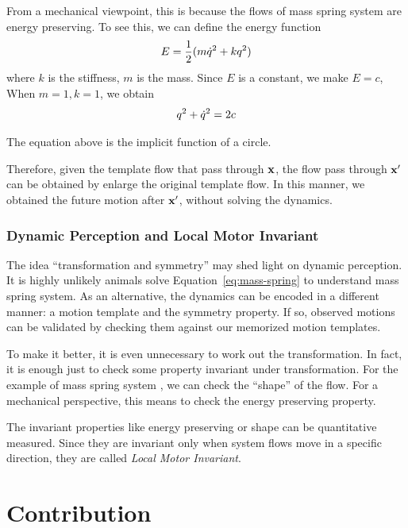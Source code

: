 From a mechanical viewpoint, this is because the flows of mass spring system are energy preserving.
To see this, we can define the energy function
\[
E=\frac{1}{2}(m\dot{q}^2+kq^2)
\]
where $k$ is the stiffness, $m$ is the mass.
Since $E$ is a constant, we make $E=c$,
When $m=1,k=1$, we obtain
\[
 q^2+\dot{q}^2=2c
\]
 
The equation above is the implicit function of a circle.

Therefore, given the template flow that pass through  $\mathbf{x}$, the flow pass through $\mathbf{x}'$  can be obtained by enlarge the original template flow.
In this manner, we obtained the future motion after $\mathbf{x}'$, without solving the dynamics.


\subsubsection*{Dynamic Perception and Local Motor Invariant}

The idea ``transformation and symmetry'' may shed light on dynamic perception. 
It is highly unlikely animals solve Equation~\ref{eq:mass-spring} to understand mass spring system.
As an alternative, the dynamics can be encoded in a different manner: a motion template and the symmetry property. 
If so, observed motions can be validated by checking them against our memorized motion templates.

To make it better, it is even unnecessary to work out the transformation.
In fact, it is enough just to check some property invariant under transformation.
For the example of mass spring system , we can check the ``shape'' of the flow.
For a mechanical perspective, this means to check the energy preserving property.

 
The invariant properties like energy preserving or shape can be quantitative measured.
Since they are invariant only when system flows move in a specific direction, they are called  \emph{Local Motor Invariant}. 


\section{Contribution}

